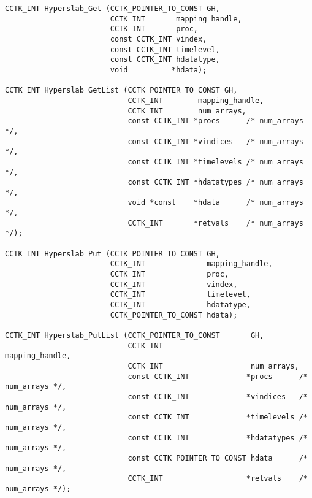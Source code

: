 \documentclass{article}
\begin{document}
\begin{verbatim}
CCTK_INT Hyperslab_Get (CCTK_POINTER_TO_CONST GH,
                        CCTK_INT       mapping_handle,
                        CCTK_INT       proc,
                        const CCTK_INT vindex,
                        const CCTK_INT timelevel,
                        const CCTK_INT hdatatype,
                        void          *hdata);

CCTK_INT Hyperslab_GetList (CCTK_POINTER_TO_CONST GH,
                            CCTK_INT        mapping_handle,
                            CCTK_INT        num_arrays,
                            const CCTK_INT *procs      /* num_arrays */,
                            const CCTK_INT *vindices   /* num_arrays */,
                            const CCTK_INT *timelevels /* num_arrays */,
                            const CCTK_INT *hdatatypes /* num_arrays */,
                            void *const    *hdata      /* num_arrays */,
                            CCTK_INT       *retvals    /* num_arrays */);

CCTK_INT Hyperslab_Put (CCTK_POINTER_TO_CONST GH,
                        CCTK_INT              mapping_handle,
                        CCTK_INT              proc,
                        CCTK_INT              vindex,
                        CCTK_INT              timelevel,
                        CCTK_INT              hdatatype,
                        CCTK_POINTER_TO_CONST hdata);

CCTK_INT Hyperslab_PutList (CCTK_POINTER_TO_CONST       GH,
                            CCTK_INT                    mapping_handle,
                            CCTK_INT                    num_arrays,
                            const CCTK_INT             *procs      /* num_arrays */,
                            const CCTK_INT             *vindices   /* num_arrays */,
                            const CCTK_INT             *timelevels /* num_arrays */,
                            const CCTK_INT             *hdatatypes /* num_arrays */,
                            const CCTK_POINTER_TO_CONST hdata      /* num_arrays */,
                            CCTK_INT                   *retvals    /* num_arrays */);
\end{verbatim}
\end{document}
